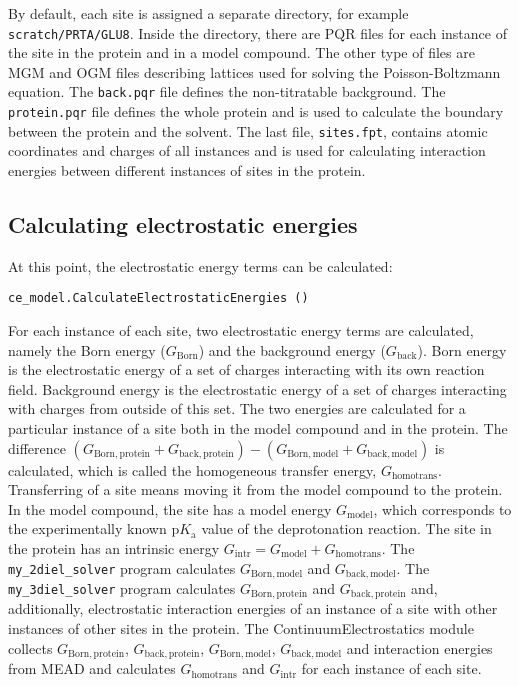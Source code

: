 \documentclass[a4paper,11pt]{article}
\newcommand{\modulename}{ContinuumElectrostatics\xspace}
\begin{document}
By default, each site is assigned a separate directory, for example
\texttt{scratch/PRTA/GLU8}.
%
Inside the directory, there are PQR files for each instance of the site in the protein
and in a model compound.
%
The other type of files are MGM and OGM files describing lattices used for
solving the Poisson-Boltzmann equation.
%
The \texttt{back.pqr} file defines the non-titratable background.
%
The \texttt{protein.pqr} file defines the whole protein and is used to calculate the boundary
between the protein and the solvent.
%
The last file, \texttt{sites.fpt}, contains atomic coordinates and charges of all instances
and is used for calculating interaction energies between
different instances of sites in the protein.


\subsection{Calculating electrostatic energies}
At this point, the electrostatic energy terms can be calculated:

{\footnotesize \begin{lstlisting}
ce_model.CalculateElectrostaticEnergies ()
\end{lstlisting} }

For each instance of each site, two electrostatic energy terms are calculated, namely
the Born energy ($G_{\mathrm{Born}}$) and the background energy ($G_{\mathrm{back}}$).
%
Born energy is the electrostatic energy of a set of charges interacting with its own
reaction field.
%
Background energy is the electrostatic energy of a set of charges interacting with
charges from outside of this set.
%
The two energies are calculated for a particular instance of a site both in the model compound
and in the protein.
%
The difference
$(G_{\mathrm{Born, protein}} + G_{\mathrm{back, protein}}) - (G_{\mathrm{Born, model}} + G_{\mathrm{back, model}})$
is calculated, which is called the homogeneous transfer energy, $G_{\mathrm{homotrans}}$.
%
Transferring of a site means moving it from the model compound to the protein.
%
In the model compound, the site has a model energy $G_{\mathrm{model}}$, which
corresponds to the experimentally known $\mathrm{p}K_{\mathrm{a}}$ value of the deprotonation reaction.
%
The site in the protein has an intrinsic energy $G_{\mathrm{intr}} = G_{\mathrm{model}} + G_{\mathrm{homotrans}}$.
%
The \texttt{my\_2diel\_solver} program calculates $G_{\mathrm{Born, model}}$ and $G_{\mathrm{back, model}}$.
%
The \texttt{my\_3diel\_solver} program calculates $G_{\mathrm{Born, protein}}$ and $G_{\mathrm{back, protein}}$
and, additionally, electrostatic interaction energies of an instance of a site
with other instances of other sites in the protein.
%
The \modulename module collects 
$G_{\mathrm{Born, protein}}$, $G_{\mathrm{back, protein}}$, 
$G_{\mathrm{Born, model}}$, $G_{\mathrm{back, model}}$ and interaction energies from MEAD 
and calculates $G_{\mathrm{homotrans}}$ and $G_{\mathrm{intr}}$ for each instance of each site.
\end{document}
